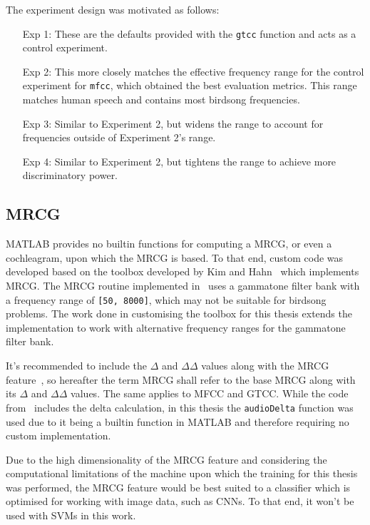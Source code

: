 The experiment design was motivated as follows:

\begin{itemize}

  \item [Exp 1:] These are the defaults provided with the \texttt{gtcc} function
    and acts as a control experiment.

  \item [Exp 2:] This more closely matches the effective frequency range for the
    control experiment for \texttt{mfcc}, which obtained the best evaluation
    metrics. This range matches human speech and contains most birdsong
    frequencies.

  \item [Exp 3:] Similar to Experiment 2, but widens the range to account for
    frequencies outside of Experiment 2's range.

  \item [Exp 4:] Similar to Experiment 2, but tightens the range to achieve more
    discriminatory power.

\end{itemize}


\subsection{MRCG}

MATLAB provides no builtin functions for computing a MRCG, or even a
cochleagram, upon which the MRCG is based. To that end, custom code was
developed based on the toolbox developed by Kim and Hahn~\cite{kim2018voice}
which implements MRCG\@. The MRCG routine implemented in~\cite{kim2018voice}
uses a gammatone filter bank with a frequency range of \texttt{[50, 8000]},
which may not be suitable for birdsong problems. The work done in customising
the toolbox for this thesis extends the implementation to work with alternative
frequency ranges for the gammatone filter bank.

It's recommended to include the $\Delta$ and $\Delta\Delta$ values along with
the MRCG feature~\cite{chen2014feature}, so hereafter the term MRCG shall refer to
the base MRCG along with its $\Delta$ and $\Delta\Delta$ values. The same
applies to MFCC and GTCC\@. While the code from~\cite{kim2018voice} includes the
delta calculation, in this thesis the \texttt{audioDelta} function was used due
to it being a builtin function in MATLAB and therefore requiring no custom
implementation.

Due to the high dimensionality of the MRCG feature and considering the
computational limitations of the machine upon which the training for this thesis
was performed, the MRCG feature would be best suited to a classifier which is
optimised for working with image data, such as CNNs\@. To that end, it won't
be used with SVMs in this work.

